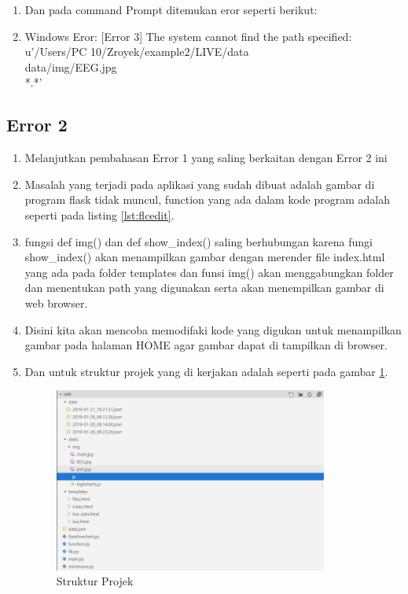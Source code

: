 \begin{enumerate}
\item Dan pada command Prompt ditemukan eror seperti berikut:
\item Windows Eror: [Error 3] The system cannot find the path specified: u'/Users/PC 10/Zroyek/example2/LIVE/data\\data/img/EEG.jpg\\*.*'
\end{enumerate}

\subsection{Error 2}
\begin{enumerate}
\item Melanjutkan pembahasan Error 1 yang saling berkaitan dengan Error 2 ini
\item Masalah yang terjadi pada aplikasi yang sudah dibuat adalah gambar di program flask tidak muncul,  function yang ada dalam kode program adalah seperti pada listing \ref{lst:flcedit}.


\item fungsi def img() dan def show\_index() saling berhubungan karena fungi show\_index() akan menampilkan gambar dengan merender file index.html yang ada pada folder templates dan funsi img() akan menggabungkan folder dan menentukan path yang digunakan serta akan menempilkan gambar di web browser.
\item Disini kita akan mencoba memodifaki kode yang digukan untuk menampilkan gambar pada halaman HOME agar gambar dapat di tampilkan di browser.
\item Dan untuk struktur projek yang di kerjakan adalah seperti pada gambar \ref{fig:strpro}.
\begin{figure}[!htbp]
	\centerline{\includegraphics[width=0.85\textwidth]{figures/9/strpro.PNG}}
	\caption{Struktur Projek}
	\label{fig:strpro}
\end{figure}


\end{enumerate}
